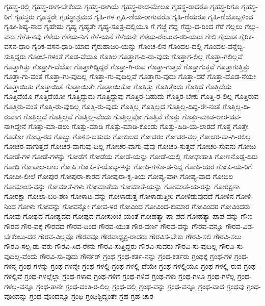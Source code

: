{ಗೃಹಸ್ಥ-ರಲ್ಲಿ
ಗೃಹಸ್ಥ-ರಾಗ-ಬೇಕೆಂದು
ಗೃಹಸ್ಥ-ರಾಗಿಯೆ
ಗೃಹಸ್ಥ-ರಾದ-ಮೇಲೂ
ಗೃಹಸ್ಥ-ರಾದರೊ
ಗೃಹಸ್ಥ-ರಿಗೂ
ಗೃಹಸ್ಥ-ರಿಗೆ
ಗೃಹಸ್ಥರು
ಗೃಹಸ್ಥರೇ
ಗೃಹಸ್ಥಾಶ್ರಮದ
ಗೃಹಿ-ಗಳ
ಗೃಹಿ-ಣಿಯ-ರಾಗುವರೊ
ಗೃಹಿ-ಣಿಯರೂ
ಗೃಹಿ-ಣಿಯೊಬ್ಬಳಿಂದ
ಗೃಹೀ-ಶಿಷ್ಯ-ನಾದ
ಗೃಹೇಷು
ಗೃಹ್ಯ
ಗೃಹ್ಯತೇ
ಗೃಹ್ಯ-ಸೂತ್ರ-ದಲ್ಲಿಯೂ
ಗೆ
ಗೆಜ್ಜೆ
ಗೆದ್ದ
ಗೆದ್ದು-ದ-ರಿಂದ
ಗೆರೆ
ಗೆಲ್ಲಲು
ಗೆಲ್ಲು-ವನು
ಗೆಳೆತ-ನವು
ಗೆಳೆಯ
ಗೆಳೆಯ-ನಿಗೆ
ಗೆಳೆ-ಯನೆ
ಗೆಳೆಯನೇ
ಗೆಳೆಯ-ರೆಂಬುವ-ರರಿ-ಯರು
ಗೇಲಿ
ಗೈಯುತ
ಗೈರಿಕ-ವಸನ-ಧಾರಿ
ಗೈರಿಕ-ವಸನ-ಧಾರಿ-ಯಾದ
ಗೈರುಹಾಜರಿ-ಯನ್ನು
ಗೊಂಚ-ಲಿನ
ಗೊಂದಲ-ದಲ್ಲಿ
ಗೊಂದಲ-ವನ್ನೆಬ್ಬಿ-ಸುತ್ತಿದ್ದರು
ಗೊಂಬೆ-ಗಳಂತೆ
ಗೊಡ-ವೆಯೂ
ಗೊತಿಲ
ಗೊತ್ತಾಗ-ದಿ-ರು-ವುದು
ಗೊತ್ತಾಗ-ಲಿಲ್ಲ
ಗೊತ್ತಾ-ಗಲಿಲ್ಲವೆ
ಗೊತ್ತಾಗಿತ್ತು
ಗೊತ್ತಾಗಿ-ದೆಯೋ
ಗೊತ್ತಾಗಿದ್ದಿದ್ದರೆ
ಗೊತ್ತಾ-ಗಿ-ರುವ
ಗೊತ್ತಾ-ಗುತ್ತದೆ
ಗೊತ್ತಾಗುತ್ತವೆ
ಗೊತ್ತಾಗುತ್ತಿತ್ತು
ಗೊತ್ತಾ-ಗು-ವಂತೆ
ಗೊತ್ತಾ-ಗು-ವುದಿಲ್ಲ
ಗೊತ್ತಾ-ಗು-ವುದಿಲ್ಲವೆ
ಗೊತ್ತಾಗು-ವುದು
ಗೊತ್ತಾ-ದರೆ
ಗೊತ್ತಾ-ದೊಡ-ನೆಯೇ
ಗೊತ್ತಾಯಿತು
ಗೊತ್ತಾಯಿತೆ
ಗೊತ್ತಾಯಿತೇ
ಗೊತ್ತಾಯಿತೋ
ಗೊತ್ತಿತ್ತು
ಗೊತ್ತಿತ್ತೆಂದು
ಗೊತ್ತಿದೆ
ಗೊತ್ತಿದೆಯೆ
ಗೊತ್ತಿದೆಯೊ
ಗೊತ್ತಿದೆಯೋ
ಗೊತ್ತಿದ್ದುದು
ಗೊತ್ತಿದ್ದುವು
ಗೊತ್ತಿರ-ಬಹುದು
ಗೊತ್ತಿರ-ಬೇಕು
ಗೊತ್ತಿ-ರ-ಲಿಲ್ಲ
ಗೊತ್ತಿರುವ
ಗೊತ್ತಿರು-ವಂತೆ
ಗೊತ್ತಿ-ರು-ವುದಿಲ್ಲ
ಗೊತ್ತಿ-ರು-ವುದು
ಗೊತ್ತಿಲ್ಲ
ಗೊತ್ತಿಲ್ಲದ
ಗೊತ್ತಿಲ್ಲ-ದಿದ್ದ-ರೇ-ನಂತೆ
ಗೊತ್ತಿಲ್ಲ-ದಿ-ರುವಾಗ
ಗೊತ್ತಿಲ್ಲದೆ
ಗೊತ್ತಿಲ್ಲವೆ
ಗೊತ್ತಿಲ್ಲ-ವೆಂದು
ಗೊತ್ತಿಲ್ಲವೋ
ಗೊತ್ತಿವೆ
ಗೊತ್ತು
ಗೊತ್ತು-ಮಾಡ-ಲಾರ-ದವ-ನಾಗಿದ್ದೇನೆ
ಗೊತ್ತು-ಮಾ-ಡಲು
ಗೊತ್ತು-ಮಾಡಿ
ಗೊತ್ತು-ಮಾಡಿ-ಕೊಂಡು
ಗೊತ್ತು-ಹಿಡಿ-ಯ-ಲಾರದೆ
ಗೊತ್ತೆ
ಗೊತ್ತೇ
ಗೊತ್ತೋ
ಗೊಬ್ಬ-ರದ
ಗೊಬ್ಬು
ಗೊಳಿಸ-ಬಹುದು
ಗೋಕುಲದ
ಗೋಚರಂ
ಗೋಚರ-ವಲ್ಲ
ಗೋಚರ-ವಾ-ಗಿ-ರಲಿಲ್ಲ
ಗೋಚರ-ವಾಗುತ್ತದೆ
ಗೋಚರ-ವಾಗುವು-ದಿಲ್ಲ
ಗೋಚರ-ವಾಗು-ವುವು
ಗೋಚರಿ-ಸುತ್ತದೆ
ಗೋಚರಿ-ಸುವನು
ಗೋಜು
ಗೋಡೆ-ಗಳ
ಗೋಡೆ-ಗಳನ್ನು
ಗೋಡೆಗೆ
ಗೋಡೆಯ
ಗೋಡೆ-ಯನ್ನು
ಗೋಡೆ-ಯಲ್ಲಿ
ಗೋಢಾಹಾತಿ
ಗೋಣನೊಡ್ಡ-ದಿರು
ಗೋಧಿ
ಗೋಪಾಲ-ಲಾಲ
ಗೋಪಿ
ಗೋಪಿ-ಕೆ-ಯೊಬ್ಬ-ಳನ್ನು
ಗೋಪಿ-ಗಳೊ-ಡ-ನಿದ್ದ
ಗೋಪಿ-ಯರ
ಗೋಪಿ-ಯ-ರಿಗೆ
ಗೋಪೀ-ಲೀಲೆ
ಗೋಪುರ
ಗೋಪುರಾ-ಕಾರದ
ಗೋಪುರಾ-ಕೃ-ತಿಯ
ಗೋಪ್ಯ-ವಾಗಿ
ಗೋಪ್ಯ-ವಾದ
ಗೋಭಿಲ
ಗೋಮಾಂಸ-ವನ್ನು
ಗೋಮಾತೆ-ಗಳು
ಗೋಮಾತೆಯ
ಗೋಮಾತೆ-ಯನ್ನು
ಗೋಮಾತೆ-ಯ-ರನ್ನು
ಗೋರಕ್ಷಣಾ
ಗೋರಕ್ಷಾ
ಗೋಲಾ-ಬರಿ-ಶಣ
ಗೋಳಾಟ-ವನ್ನು
ಗೋಳಾಡುತ್ತ
ಗೋಳಾಡುತ್ತೀರಿ
ಗೋಳಿಡುವುದದೆ
ಗೋಳಿನ
ಗೋಳಿ-ನಿಂದ
ಗೋಳು
ಗೋವನ್ನು
ಗೋವನ್ನೋ
ಗೋವ-ಳರ
ಗೋವಿಂದ
ಗೋವಿಂದ-ಕುಮಾರ
ಗೋವಿಂದರ
ಗೋವಿಂದರು
ಗೋವು
ಗೋಶ್ಪದ
ಗೋಷ್ಟದದ
ಗೋಷ್ಪದ
ಗೋಸುಂಬೆ-ಯಂತೆ
ಗೋಹತ್ಯಾ-ಪಾ-ಪದ
ಗೋಹತ್ಯಾ-ಪಾಪ-ವನ್ನು
ಗೌಣ
ಗೌರವ
ಗೌರ-ವಕ್ಕೆ
ಗೌರವದ
ಗೌರವ-ದಿಂದ
ಗೌರವ-ಯುತ
ಗೌರ-ವರ್ಣ
ಗೌರವ-ವನ್ನು
ಗೌರವ-ವನ್ನೂ
ಗೌರವ-ವಿಡ-ಬೇಕೆಂಬು-ದರ
ಗೌರವ-ವಿಲ್ಲವೊ
ಗೌರವವೂ
ಗೌರವಾಧ್ಯಕ್ಷ-ರಾದರು
ಗೌರವಿಸ-ಬೇಕು
ಗೌರವಿ-ಸಲಿ
ಗೌರವಿ-ಸಲು
ಗೌರವಿ-ಸಲ್ಪ-ಡು-ವರು
ಗೌರವಿ-ಸಿದ-ರೇನು
ಗೌರವಿ-ಸುತ್ತಿದ್ದರು
ಗೌರವಿ-ಸುವರು
ಗೌರವಿ-ಸು-ವುದಿಲ್ಲ
ಗೌರವಿ-ಸು-ವುದಿಲ್ಲ-ವೆಂದು
ಗೌರವಿ-ಸು-ವುದು
ಗೌರ್ನರ್
ಗ್ರಂಥ
ಗ್ರಂಥ-ಕರ್ತ-ನನ್ನು
ಗ್ರಂಥ-ಕರ್ತರು
ಗ್ರಂಥಕ್ಕೆ
ಗ್ರಂಥ-ಗಳ
ಗ್ರಂಥ-ಗಳನ್ನ
ಗ್ರಂಥ-ಗಳನ್ನು
ಗ್ರಂಥ-ಗಳನ್ನೇ
ಗ್ರಂಥ-ಗಳಲ್ಲಿ
ಗ್ರಂಥ-ಗಳಲ್ಲಿ-ದೆಯೇ
ಗ್ರಂಥ-ಗಳಲ್ಲಿಯೂ
ಗ್ರಂಥ-ಗಳಲ್ಲಿ-ರುವ
ಗ್ರಂಥ-ಗಳಲ್ಲಿವೆ
ಗ್ರಂಥ-ಗಳಲ್ಲೆಲ್ಲಾ
ಗ್ರಂಥ-ಗಳಾದ
ಗ್ರಂಥ-ಗಳಿಗೆ
ಗ್ರಂಥ-ಗಳಿವೆ
ಗ್ರಂಥ-ಗಳು
ಗ್ರಂಥ-ಗಳೂ
ಗ್ರಂಥ-ಗಳೆಲ್ಲ
ಗ್ರಂಥ-ಗಳೆಲ್ಲ-ವನ್ನೂ
ಗ್ರಂಥ-ತಾನೇ
ಗ್ರಂಥ-ದಂತಿ-ರ-ಲಿಲ್ಲ
ಗ್ರಂಥ-ದಲ್ಲಿ
ಗ್ರಂಥ-ವನ್ನು
ಗ್ರಂಥ-ವನ್ನೂ
ಗ್ರಂಥ-ವಾದ
ಗ್ರಂಥವು
ಗ್ರಂಥ-ವೊಂದನ್ನು
ಗ್ರಂಥ-ವೊಂದನ್ನೂ
ಗ್ರಂಥಿ
ಗ್ರಂಥಿಶ್ಛಿದ್ಯಂತೇ
ಗ್ರಹ
ಗ್ರಹ-ಚಾರ
}
